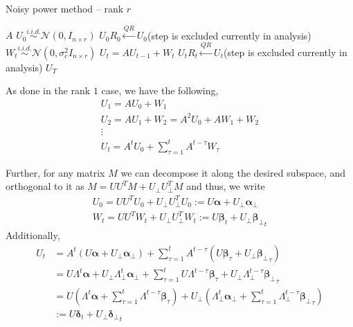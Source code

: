 \documentclass[10pt]{article}
\begin{document}
\begin{algorithm}[H]
\caption{Noisy power method -- rank $r$}\label{algo:rankr}
  \begin{algorithmic}[1]
    \REQUIRE $A$ 
    \STATE $U_0 \overset{i.i.d.}{\sim} \mathcal{N}(0, I_{n \times r})$ %
    \STATE $U_0 R_0 \overset{QR}{\leftarrow} U_0$(step is excluded currently in analysis)
    \STATE $W_t \overset{i.i.d.}{\sim} \mathcal{N}(0, \sigma_c^2 I_{n \times r})$
    \STATE $U_t = A U_{t-1} + W_t$ 
    \STATE $U_t R_t \overset{QR}{\leftarrow} U_t$(step is excluded currently in analysis)
    \ENDFOR
    \ENSURE $U_T$ 
  \end{algorithmic}
\end{algorithm}


\newcommand{\ucos}{\bm{\alpha}}
\newcommand{\usin}{\bm{\alpha}_{\perp}}

\newcommand{\wcos}{\bm{\beta}}
\newcommand{\wsin}{{\bm{\beta}_{\perp}}}

\newcommand{\utcos}{\bm{\delta}}
\newcommand{\utsin}{{\bm{\delta}_{\perp}}}


As done in the rank $1$ case, we have the following, 
\begin{gather*}
U_1 = A U_0 + W_1 \\
U_2 = A U_1 + W_2 = A^2 U_0 + A W_1 + W_2\\
\vdots \\
U_t = A^t U_0 + \sum_{\tau = 1}^t A^{t-\tau} W_\tau
\end{gather*}

Further, for any matrix $M$ we can decompose it along the desired subspace, and orthogonal to it as $M = U U^T M + U_{\perp} U_{\perp}^T M$ and thus, we write
\begin{gather*}
U_0 = U U^T U_0 + U_{\perp} U_{\perp}^T U_0 := U \ucos + U_{\perp} \usin \\
W_t = U U^T W_t + U_{\perp} U_{\perp}^T W_t := U \wcos_t + U_{\perp} \wsin_t 
\end{gather*}
Additionally, 
\begin{align*}
U_t &= A^t (U \ucos + U_{\perp} \usin) + \sum_{\tau = 1}^t A^{t-\tau} (U \wcos_\tau + U_{\perp} \wsin_\tau) \\
&= U \Lambda^t \ucos + U_\perp \Lambda_\perp^t \usin + \sum_{\tau = 1}^t U \Lambda^{t-\tau} \wcos_\tau + U_\perp \Lambda_\perp^{t-\tau} \wsin_\tau \\
&= U\left( \Lambda^t \ucos + \sum_{\tau=1}^t \Lambda^{t-\tau} \wcos_\tau \right) + U_\perp \left( \Lambda_\perp^t \usin + \sum_{\tau=1}^t \Lambda_\perp^{t-\tau} \wsin_\tau \right) \\
&:= U \utcos_t + U_\perp \utsin_t
\end{align*}
\end{document}
